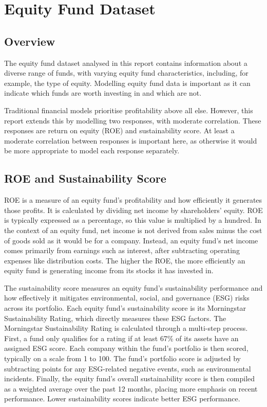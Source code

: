 \documentclass[11pt]{report} %
\begin{document}
\section{Equity Fund Dataset}
\subsection{Overview}
The equity fund dataset analysed in this report contains information about a diverse range of funds, with varying equity fund characteristics, including, for example, the type of equity. Modelling equity fund data is important as it can indicate which funds are worth investing in and which are not. 

Traditional financial models prioritise profitability above all else.\cite{KumarSus} However, this report extends this by modelling two responses, with moderate correlation. These responses are return on equity (ROE) and sustainability score. At least a moderate correlation between responses is important here, as otherwise it would be more appropriate to model each response separately. 

\subsection{ROE and Sustainability Score}
ROE is a measure of an equity fund's profitability and how efficiently it generates those profits.\cite{fernando2023return} It is calculated by dividing net income by shareholders' equity.\cite{fernando2023return} ROE is typically expressed as a percentage, so this value is multiplied by a hundred. In the context of an equity fund, net income is not derived from sales minus the cost of goods sold as it would be for a company.\cite{kenton2024netincome} Instead, an equity fund’s net income comes primarily from earnings such as interest, after subtracting operating expenses like distribution costs.\cite{kenton2024netincome} The higher the ROE, the more efficiently an equity fund is generating income from its stocks it has invested in.\cite{franklin2019principles}

The sustainability score measures an equity fund’s sustainability performance and how effectively it mitigates environmental, social, and governance (ESG) risks across its portfolio. Each equity fund's sustainability score is its Morningstar Sustainability Rating, which directly measures these ESG factors.
The Morningstar Sustainability Rating is calculated through a multi-step process. First, a fund only qualifies for a rating if at least 67\% of its assets have an assigned ESG score.
Each company within the fund’s portfolio is then scored, typically on a scale from 1 to 100. The fund’s portfolio score is adjusted by subtracting points for any ESG-related negative events, such as environmental incidents. Finally, the equity fund's overall sustainability score is then compiled as a weighted average over the past 12 months, placing more emphasis on recent performance.\cite{chen2023morningstar} Lower sustainability scores indicate better ESG performance. 
\end{document}
